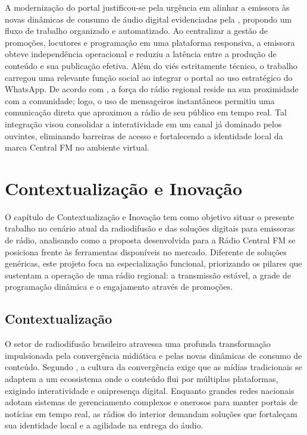 \documentclass[12pt, openright, oneside, a4paper, brazil]{ads-unipac-abntex2}
\begin{document}
A modernização do portal justificou-se pela urgência em alinhar a emissora às novas dinâmicas de consumo de áudio digital evidenciadas pela , propondo um fluxo de trabalho organizado e automatizado. Ao centralizar a gestão de promoções, locutores e programação em uma plataforma responsiva, a emissora obteve independência operacional e reduziu a latência entre a produção de conteúdo e sua publicação efetiva. Além do viés estritamente técnico, o trabalho carregou uma relevante função social ao integrar o portal ao uso estratégico do WhatsApp. De acordo com , a força do rádio regional reside na sua proximidade com a comunidade; logo, o uso de mensageiros instantâneos permitiu uma comunicação direta que aproximou a rádio de seu público em tempo real. Tal integração visou consolidar a interatividade em um canal já dominado pelos ouvintes, eliminando barreiras de acesso e fortalecendo a identidade local da marca Central FM no ambiente virtual.

\chapter[Contextualização e Inovação]{Contextualização e Inovação}
O capítulo de Contextualização e Inovação tem como objetivo situar o presente trabalho no cenário atual da radiodifusão e das soluções digitais para emissoras de rádio, analisando como a proposta desenvolvida para a Rádio Central FM se posiciona frente às ferramentas disponíveis no mercado. Diferente de soluções genéricas, este projeto foca na especialização funcional, priorizando os pilares que sustentam a operação de uma rádio regional: a transmissão estável, a grade de programação dinâmica e o engajamento através de promoções.

\section{Contextualização}
O setor de radiodifusão brasileiro atravessa uma profunda transformação impulsionada pela convergência midiática e pelas novas dinâmicas de consumo de conteúdo. Segundo , a cultura da convergência exige que as mídias tradicionais se adaptem a um ecossistema onde o conteúdo flui por múltiplas plataformas, exigindo interatividade e onipresença digital. Enquanto grandes redes nacionais adotam sistemas de gerenciamento complexos e onerosos para manter portais de notícias em tempo real, as rádios do interior demandam soluções que fortaleçam sua identidade local e a agilidade na entrega do áudio.
\end{document}
